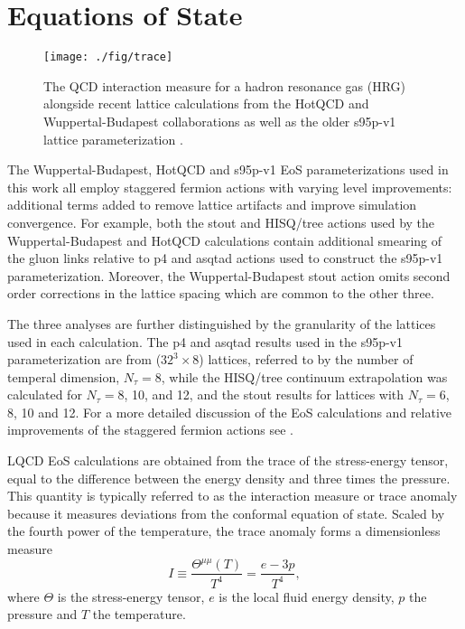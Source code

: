 \documentclass[aps,prc,reprint,amsmath,nofootinbib,superscriptaddress]{revtex4-1}
\begin{document}
\section{Equations of State}
\label{eos}

\begin{figure}[t]
  \texttt{[image: ./fig/trace]}
  \caption{\label{fig:trace} The QCD interaction measure for a hadron resonance gas (HRG) alongside recent lattice calculations from the HotQCD and Wuppertal-Budapest collaborations as well as the older s95p-v1 lattice parameterization \cite{Bazavov:2014pvz, Borsanyi:2013bia, Huovinen:2009yb}.}
\end{figure}

The Wuppertal-Budapest, HotQCD and s95p-v1 EoS parameterizations used in this work all employ staggered fermion actions with varying level improvements: additional terms added to remove lattice artifacts and improve simulation convergence. 
For example, both the stout and HISQ/tree actions used by the Wuppertal-Budapest and HotQCD calculations contain additional smearing of the gluon links relative to p4 and asqtad actions used to construct the s95p-v1 parameterization.
Moreover, the Wuppertal-Budapest stout action omits second order corrections in the lattice spacing which are common to the other three. 

The three analyses are further distinguished by the granularity of the lattices used in each calculation.
The p4 and asqtad results used in the s95p-v1 parameterization are from ($32^3 \times 8$) lattices, referred to by the number of temperal dimension, $N_{\tau}=8$, while the HISQ/tree continuum extrapolation was calculated for $N_{\tau}=8$, 10, and 12, and the stout results for lattices with $N_{\tau}=6$, 8, 10 and 12. 
For a more detailed discussion of the EoS calculations and relative improvements of the staggered fermion actions see \cite{Soltz:2015ula}.

LQCD EoS calculations are obtained from the trace of the stress-energy tensor, equal to the difference between the energy density and three times the pressure. 
This quantity is typically referred to as the interaction measure or trace anomaly  because it measures deviations from the conformal equation of state. 
Scaled by the fourth power of the temperature, the trace anomaly forms a dimensionless measure 
\begin{equation}
 I \equiv \frac{\Theta^{\mu\mu}(T)}{T^4} = \frac{e - 3p}{T^4},
\end{equation}
where $\Theta$ is the stress-energy tensor, $e$ is the local fluid energy density, $p$ the pressure and $T$ the temperature.
\end{document}
